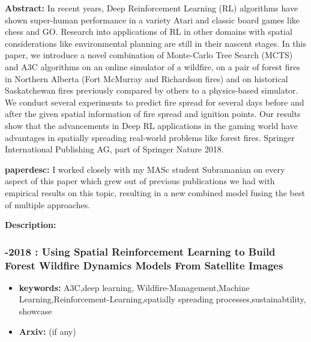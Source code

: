 \documentclass{article}
\begin{document}

\textbf{Abstract:} In recent years, Deep Reinforcement Learning (RL) algorithms have shown super-human performance in a variety Atari and classic board games like chess and GO. Research into applications of RL in other domains with spatial considerations like environmental planning are still in their nascent stages. In this paper, we introduce a novel combination of Monte-Carlo Tree Search (MCTS) and A3C algorithms on an online simulator of a wildfire, on a pair of forest fires in Northern Alberta (Fort McMurray and Richardson fires) and on historical Saskatchewan fires previously compared by others to a physics-based simulator. We conduct several experiments to predict fire spread for several days before and after the given spatial information of fire spread and ignition points. Our results show that the advancements in Deep RL applications in the gaming world have advantages in spatially spreading real-world problems like forest fires. {\textcopyright} Springer International Publishing AG, part of Springer Nature 2018.

\textbf{paperdesc:} I worked closely with my MASc student Subramanian on every aspect of this paper which grew out of previous publications we had with empirical results on this topic, resulting in a new combined model fusing the best of multiple approaches.

\textbf{Description:} 



\newpage
\subsubsection{\textbf{-2018} : Using Spatial Reinforcement Learning to Build Forest Wildfire Dynamics Models From Satellite Images}
\begin{itemize}
\item \textbf{keywords:} A3C,deep learning, Wildfire-Management,Machine Learning,Reinforcement-Learning,spatially spreading processes,sustainabtility, showcase
\item \textbf{Arxiv:}  (if any)
\end{itemize}
\end{document}
